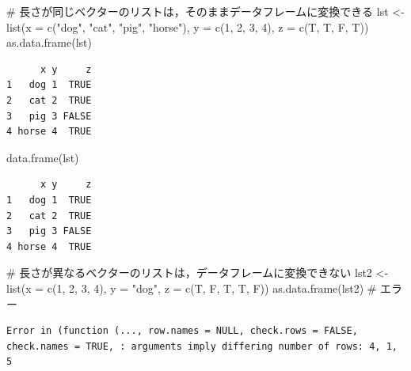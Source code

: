 \documentclass[
  letterpaper,
  DIV=11,
  numbers=noendperiod]{scrreprt}
\newenvironment{Shaded}{\begin{snugshade}}{\end{snugshade}}
\newcommand{\AttributeTok}[1]{\textcolor[rgb]{0.40,0.45,0.13}{#1}}
\newcommand{\CommentTok}[1]{\textcolor[rgb]{0.37,0.37,0.37}{#1}}
\newcommand{\DecValTok}[1]{\textcolor[rgb]{0.68,0.00,0.00}{#1}}
\newcommand{\FunctionTok}[1]{\textcolor[rgb]{0.28,0.35,0.67}{#1}}
\newcommand{\NormalTok}[1]{\textcolor[rgb]{0.00,0.23,0.31}{#1}}
\newcommand{\OtherTok}[1]{\textcolor[rgb]{0.00,0.23,0.31}{#1}}
\newcommand{\StringTok}[1]{\textcolor[rgb]{0.13,0.47,0.30}{#1}}
\begin{document}
\begin{Shaded}
\begin{Highlighting}[]
\CommentTok{\# 長さが同じベクターのリストは，そのままデータフレームに変換できる}
\NormalTok{lst }\OtherTok{\textless{}{-}} \FunctionTok{list}\NormalTok{(}\AttributeTok{x =} \FunctionTok{c}\NormalTok{(}\StringTok{"dog"}\NormalTok{, }\StringTok{"cat"}\NormalTok{, }\StringTok{"pig"}\NormalTok{, }\StringTok{"horse"}\NormalTok{), }\AttributeTok{y =} \FunctionTok{c}\NormalTok{(}\DecValTok{1}\NormalTok{, }\DecValTok{2}\NormalTok{, }\DecValTok{3}\NormalTok{, }\DecValTok{4}\NormalTok{), }\AttributeTok{z =} \FunctionTok{c}\NormalTok{(T, T, F, T))}
\FunctionTok{as.data.frame}\NormalTok{(lst)}
\end{Highlighting}
\end{Shaded}

\begin{verbatim}
      x y     z
1   dog 1  TRUE
2   cat 2  TRUE
3   pig 3 FALSE
4 horse 4  TRUE
\end{verbatim}

\begin{Shaded}
\begin{Highlighting}[]
\FunctionTok{data.frame}\NormalTok{(lst)}
\end{Highlighting}
\end{Shaded}

\begin{verbatim}
      x y     z
1   dog 1  TRUE
2   cat 2  TRUE
3   pig 3 FALSE
4 horse 4  TRUE
\end{verbatim}

\begin{Shaded}
\begin{Highlighting}[]
\CommentTok{\# 長さが異なるベクターのリストは，データフレームに変換できない}
\NormalTok{lst2 }\OtherTok{\textless{}{-}} \FunctionTok{list}\NormalTok{(}\AttributeTok{x =} \FunctionTok{c}\NormalTok{(}\DecValTok{1}\NormalTok{, }\DecValTok{2}\NormalTok{, }\DecValTok{3}\NormalTok{, }\DecValTok{4}\NormalTok{), }\AttributeTok{y =} \StringTok{"dog"}\NormalTok{, }\AttributeTok{z =} \FunctionTok{c}\NormalTok{(T, F, T, T, F))}
\FunctionTok{as.data.frame}\NormalTok{(lst2) }\CommentTok{\# エラー}
\end{Highlighting}
\end{Shaded}

\begin{verbatim}
Error in (function (..., row.names = NULL, check.rows = FALSE, check.names = TRUE, : arguments imply differing number of rows: 4, 1, 5
\end{verbatim}
\end{document}
